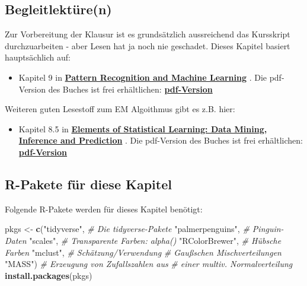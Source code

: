 \documentclass[
  ngerman,
]{book}
\newenvironment{Shaded}{\begin{snugshade}}{\end{snugshade}}
\newcommand{\CommentTok}[1]{\textcolor[rgb]{0.56,0.35,0.01}{\textit{#1}}}
\newcommand{\KeywordTok}[1]{\textcolor[rgb]{0.13,0.29,0.53}{\textbf{#1}}}
\newcommand{\NormalTok}[1]{#1}
\newcommand{\StringTok}[1]{\textcolor[rgb]{0.31,0.60,0.02}{#1}}
\providecommand{\tightlist}{%
  \setlength{\itemsep}{0pt}\setlength{\parskip}{0pt}}
\begin{document}
\hypertarget{begleitlektuxfcren}{%
\subsection*{Begleitlektüre(n)}\label{begleitlektuxfcren}}

Zur Vorbereitung der Klausur ist es grundsätzlich aussreichend das Kursskript durchzuarbeiten - aber Lesen hat ja noch nie geschadet. Dieses Kapitel basiert hauptsächlich auf:

\begin{itemize}
\tightlist
\item
  Kapitel 9 in \href{https://www.microsoft.com/en-us/research/uploads/prod/2006/01/Bishop-Pattern-Recognition-and-Machine-Learning-2006.pdf}{\textbf{Pattern Recognition and Machine Learning}} \citep{book_Bishop2006}.
  Die pdf-Version des Buches ist frei erhältlichen: \href{https://www.microsoft.com/en-us/research/uploads/prod/2006/01/Bishop-Pattern-Recognition-and-Machine-Learning-2006.pdf}{\textbf{pdf-Version}}
\end{itemize}

Weiteren guten Lesestoff zum EM Algoithmus gibt es z.B. hier:

\begin{itemize}
\tightlist
\item
  Kapitel 8.5 in \href{https://web.stanford.edu/~hastie/ElemStatLearn/}{\textbf{Elements of Statistical Learning: Data Mining, Inference and Prediction}} \citep{Elements}.
  Die pdf-Version des Buches ist frei erhältlichen: \href{https://web.stanford.edu/~hastie/ElemStatLearn/}{\textbf{pdf-Version}}
\end{itemize}

\hypertarget{r-pakete-fuxfcr-diese-kapitel}{%
\subsection*{R-Pakete für diese Kapitel}\label{r-pakete-fuxfcr-diese-kapitel}}

Folgende R-Pakete werden für dieses Kapitel benötigt:

\begin{Shaded}
\begin{Highlighting}[]
\NormalTok{pkgs <-}\StringTok{ }\KeywordTok{c}\NormalTok{(}\StringTok{"tidyverse"}\NormalTok{,      }\CommentTok{# Die tidyverse-Pakete}
          \StringTok{"palmerpenguins"}\NormalTok{, }\CommentTok{# Pinguin-Daten}
          \StringTok{"scales"}\NormalTok{,         }\CommentTok{# Transparente Farben: alpha()}
          \StringTok{"RColorBrewer"}\NormalTok{,   }\CommentTok{# Hübsche Farben}
          \StringTok{"mclust"}\NormalTok{,         }\CommentTok{# Schätzung/Verwendung }
                            \CommentTok{# Gaußschen Mischverteilungen}
          \StringTok{"MASS"}\NormalTok{)           }\CommentTok{# Erzeugung von Zufallszahlen aus }
                            \CommentTok{# einer multiv. Normalverteilung}
\KeywordTok{install.packages}\NormalTok{(pkgs)}
\end{Highlighting}
\end{Shaded}
\end{document}
